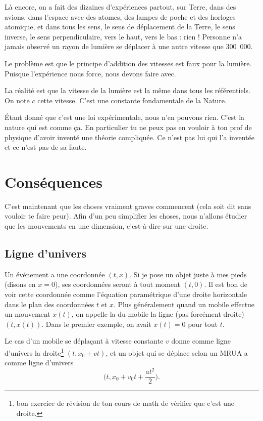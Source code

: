 Là encore, on a fait des dizaines d'expériences partout, sur Terre, dans des avions, dans l'espace avec des atomes, des lampes de poche et des horloges atomique, et dans tous les sens, le sens de déplacement de la Terre, le sens inverse, le sens perpendiculaire, vers le haut, vers le bas : rien ! Personne n'a jamais observé un rayon de lumière se déplacer à une autre vitesse que \unit{300.000}{\kilo\meter\per\second}.

Le problème est que le principe d'addition des vitesses est faux pour la lumière. Puisque l'expérience nous force, nous devons faire avec.

\begin{loiphyz}		\label{LoiVitLum}
	La réalité est que la vitesse de la lumière est la même dans tous les référentiels. On note \( c\) cette vitesse. C'est une constante fondamentale de la Nature.
\end{loiphyz}
Étant donné que c'est une loi expérimentale, nous n'en pouvons rien. C'est la nature qui est comme ça. En particulier tu ne peux pas en vouloir à ton prof de physique d'avoir inventé une théorie compliquée. Ce n'est pas lui qui l'a inventée et ce n'est pas de sa faute.


\section{Conséquences}

C'est maintenant que les choses vraiment graves commencent (cela soit dit sans vouloir te faire peur). Afin d'un peu simplifier les choses, nous n'allons  étudier que les mouvements en une dimension, c'est-à-dire sur une droite.

\subsection{Ligne d'univers}

Un événement a une coordonnée \( (t,x)\). Si je pose un objet juste à mes pieds (disons en \( x=0\)), ses coordonnées seront à tout moment \( (t,0)\). Il est bon de voir cette coordonnée comme l'équation paramétrique d'une droite horizontale dans le plan des coordonnées \( t\) et \( x\). Plus généralement quand un mobile effectue un mouvement \( x(t)\), on appelle la  du mobile la ligne (pas forcément droite) \( (t,x(t))\). Dans le premier exemple, on avait \( x(t)=0\) pour tout \( t\).

Le cas d'un mobile se déplaçant à vitesse constante \( v\) donne comme ligne d'univers la droite\footnote{bon exercice de révision de ton cours de math de vérifier que c'est une droite.} \( (t,x_0+vt)\), et un objet qui se déplace selon un MRUA a comme ligne d'univers
\[
	\big( t, x_0+v_0t+\frac{ at^2 }{ 2 } \big).
\]

